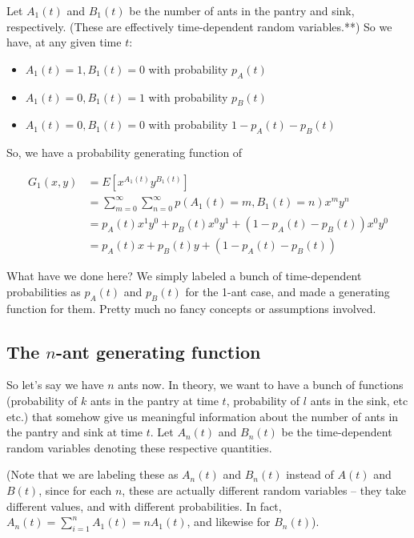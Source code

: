 \documentclass{article}
\begin{document}
Let $A_1(t)$ and $B_1(t)$ be the number of ants in the pantry and sink, respectively. (These are effectively time-dependent random variables.**) So we have, at any given time $t$:

\begin{itemize}
\item $A_1(t) = 1, B_1(t) = 0$ with probability $p_A(t)$
\item $A_1(t) = 0, B_1(t) = 1$ with probability $p_B(t)$
\item $A_1(t) = 0, B_1(t) = 0$ with probability $1 - p_A(t) - p_B(t)$
\end{itemize}


\vspace{10mm}

So, we have a probability generating function of

\begin{align*}
G_1(x,y) &= E[x^{A_1(t)} y^{B_1(t)}] \\
&= \sum_{m=0}^{\infty} \sum_{n=0}^{\infty} p(A_1(t) = m, B_1(t) = n)x^m y^n \\
&= p_A(t) x^1 y^0 + p_B(t) x^0 y^1 + (1 - p_A(t) - p_B(t))x^0 y^0 \\
&= p_A(t) x + p_B(t) y + (1 - p_A(t) - p_B(t))
\end{align*}

What have we done here? We simply labeled a bunch of time-dependent probabilities as $p_A(t)$ and $p_B(t)$ for the 1-ant case, and made a generating function for them. Pretty much no fancy concepts or assumptions involved. 


\subsection{The $n$-ant generating function}

So let's say we have $n$ ants now. In theory, we want to have a bunch of functions (probability of $k$ ants in the pantry at time $t$, probability of $l$ ants in the sink, etc etc.) that somehow give us meaningful information about the number of ants in the pantry and sink at time $t$. Let $A_n(t)$ and $B_n(t)$ be the time-dependent random variables denoting these respective quantities.

(Note that we are labeling these as $A_n(t)$ and $B_n(t)$ instead of $A(t)$ and $B(t)$, since for each $n$, these are actually different random variables -- they take different values, and with different probabilities. In fact, $A_n(t) = \sum_{i=1}^n A_1(t) = nA_1(t)$, and likewise for $B_n(t)$).
\end{document}
